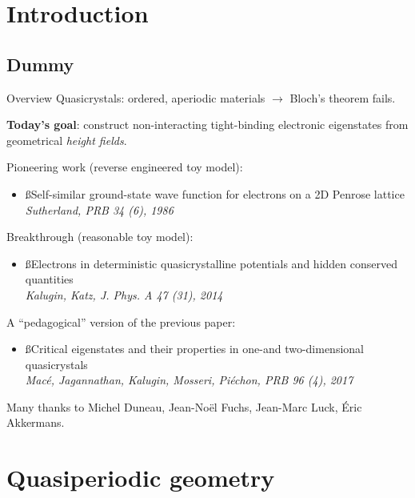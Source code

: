 \section{Introduction}
\subsection{Dummy}

\begin{frame}{Overview}
Quasicrystals: ordered, aperiodic materials $\to$ Bloch's theorem fails.

\textbf{Today's goal}: construct non-interacting tight-binding electronic eigenstates from geometrical \emph{height fields}.

Pioneering work (reverse engineered toy model):
\begin{itemize}
	\item {\ss{Self-similar ground-state wave function for electrons on a 2D Penrose lattice}\\\emph{Sutherland, PRB 34 (6), 1986}}
\end{itemize}
Breakthrough (reasonable toy model):
\begin{itemize}
	\item {\ss{Electrons in deterministic quasicrystalline potentials and hidden conserved quantities}\\\emph{Kalugin, Katz, J. Phys. A 47 (31), 2014}}
\end{itemize}
A ``pedagogical'' version of the previous paper:
\begin{itemize}
	\item {\ss{Critical eigenstates and their properties in one-and two-dimensional quasicrystals}\\
	\emph{Macé, Jagannathan, Kalugin, Mosseri, Piéchon, PRB 96 (4), 2017}}
\end{itemize}

Many thanks to Michel Duneau, Jean-Noël Fuchs, Jean-Marc Luck, Éric Akkermans.
\end{frame}

\section{Quasiperiodic geometry}
